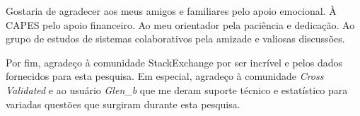 Gostaria de agradecer aos meus amigos e familiares pelo apoio emocional. À CAPES pelo apoio financeiro. Ao meu orientador pela paciência e dedicação. Ao grupo de estudos de sistemas colaborativos pela amizade e valiosas discussões.

Por fim, agradeço à comunidade StackExchange por ser incrível e pelos dados fornecidos para esta pesquisa. Em especial, agradeço à comunidade \textit{Cross Validated} e ao usuário \textit{Glen\_b} que me deram suporte técnico e estatístico para variadas questões que surgiram durante esta pesquisa. 
